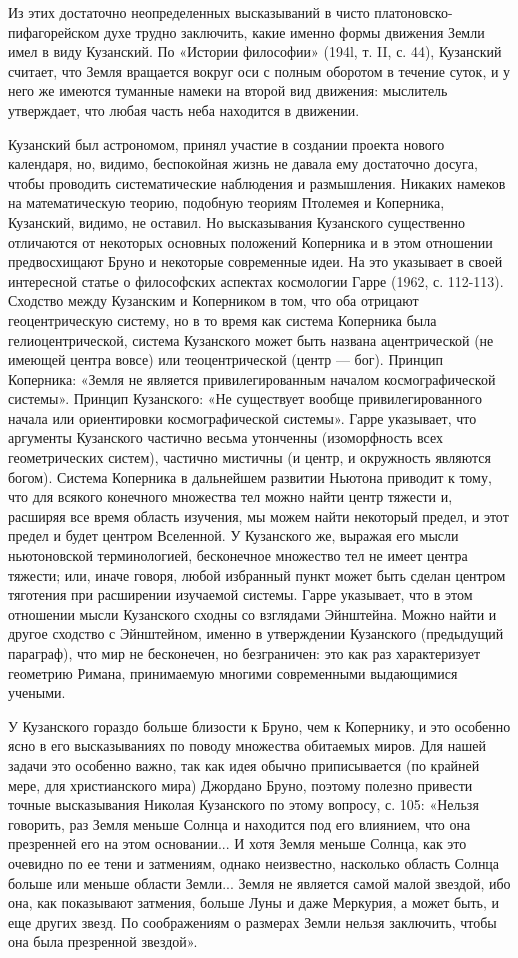 Из этих достаточно неопределенных высказываний в чисто
платоновско-пифагорейском духе трудно заключить, какие именно формы
движения Земли имел в виду Кузанский. По «Истории философии» (194l, т.
II, с. 44), Кузанский считает, что Земля вращается вокруг оси с полным
оборотом в течение суток, и у него же имеются туманные намеки на
второй вид движения: мыслитель утверждает, что любая часть неба
находится в движении.

Кузанский был астрономом, принял участие в создании проекта нового
календаря, но, видимо, беспокойная жизнь не давала ему достаточно
досуга, чтобы проводить систематические наблюдения и размышления.
Никаких намеков на математическую теорию, подобную теориям Птолемея и
Коперника, Кузанский, видимо, не оставил. Но высказывания Кузанского
существенно отличаются от некоторых основных положений Коперника и в
этом отношении предвосхищают Бруно и некоторые современные идеи. На
это указывает в своей интересной статье о философских аспектах
космологии Гарре (1962, с. 112-113). Сходство между Кузанским и
Коперником в том, что оба отрицают геоцентрическую систему, но в то
время как система Коперника была гелиоцентрической, система Кузанского
может быть названа ацентрической (не имеющей центра вовсе) или
теоцентрической (центр --- бог). Принцип Коперника: «Земля не является
привилегированным началом космографической системы». Принцип
Кузанского: «Не существует вообще привилегированного начала или
ориентировки космографической системы». Гарре указывает, что аргументы
Кузанского частично весьма утонченны (изоморфность всех геометрических
систем), частично мистичны (и центр, и окружность являются богом).
Система Коперника в дальнейшем развитии Ньютона приводит к тому, что
для всякого конечного множества тел можно найти центр тяжести и,
расширяя все время область изучения, мы можем найти некоторый предел,
и этот предел и будет центром Вселенной. У Кузанского же, выражая его
мысли ньютоновской терминологией, бесконечное множество тел не имеет
центра тяжести; или, иначе говоря, любой избранный пункт может быть
сделан центром тяготения при расширении изучаемой системы. Гарре
указывает, что в этом отношении мысли Кузанского сходны со взглядами
Эйнштейна. Можно найти и другое сходство с Эйнштейном, именно в
утверждении Кузанского (предыдущий параграф), что мир не бесконечен,
но безграничен: это как раз характеризует геометрию Римана,
принимаемую многими современными выдающимися учеными.

У Кузанского гораздо больше близости к Бруно, чем к Копернику, и это
особенно ясно в его высказываниях по поводу множества обитаемых миров.
Для нашей задачи это особенно важно, так как идея обычно приписывается
(по крайней мере, для христианского мира) Джордано Бруно, поэтому
полезно привести точные высказывания Николая Кузанского по этому
вопросу, с. 105: «Нельзя говорить, раз Земля меньше Солнца и находится
под его влиянием, что она презренней его на этом основании... И хотя
Земля меньше Солнца, как это очевидно по ее тени и затмениям, однако
неизвестно, насколько область Солнца больше или меньше области
Земли... Земля не является самой малой звездой, ибо она, как
показывают затмения, больше Луны и даже Меркурия, а может быть, и еще
других звезд. По соображениям о размерах Земли нельзя заключить, чтобы
она была презренной звездой».

